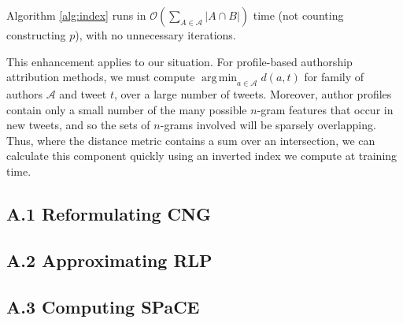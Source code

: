 \documentclass[twocolumn,10pt]{article}
\DeclareMathOperator*{\argmin}{arg\,min}
\begin{document}
Algorithm \ref{alg:index} runs in $\mathcal{O}(\sum_{A \in \mathcal{A}} |A \cap B|)$
time (not counting constructing $p$), with no unnecessary iterations.

This enhancement applies to our situation. For profile-based
authorship attribution methods, we must compute
$
\argmin_{a\in\mathcal{A}}{d(a, t)}
$
for family of authors $\mathcal{A}$ and tweet $t$, over a large
number of tweets. Moreover, author profiles contain only a small
number of the many possible $n$-gram features that occur in new
tweets, and so the sets of $n$-grams involved will be sparsely
overlapping.
Thus, where the distance metric contains a sum over an intersection,
we can calculate this component quickly using an inverted index we
compute at training time.

\subsection*{A.1 Reformulating CNG}

\subsection*{A.2 Approximating RLP}

\subsection*{A.3 Computing SPaCE}
\end{document}
